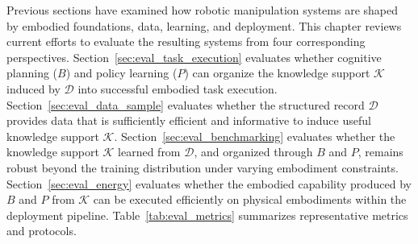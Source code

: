 \documentclass[acmsmall,screen,review]{acmart}
\begin{document}
Previous sections have examined how robotic manipulation systems are shaped by embodied foundations, data, learning, and deployment. 
This chapter reviews current efforts to evaluate the resulting systems from four corresponding perspectives.
Section~\ref{sec:eval_task_execution} evaluates whether cognitive planning (\(B\)) and policy learning (\(P\)) can organize the knowledge support \(\mathcal{K}\) induced by \(\mathcal{D}\) into successful embodied task execution. 
Section~\ref{sec:eval_data_sample} evaluates whether the structured record \(\mathcal{D}\) provides data that is sufficiently efficient and informative to induce useful knowledge support \(\mathcal{K}\). 
Section~\ref{sec:eval_benchmarking} evaluates whether the knowledge support \(\mathcal{K}\) learned from \(\mathcal{D}\), and organized through \(B\) and \(P\), remains robust beyond the training distribution under varying embodiment constraints. 
Section~\ref{sec:eval_energy} evaluates whether the embodied capability produced by \(B\) and \(P\) from \(\mathcal{K}\) can be executed efficiently on physical embodiments within the deployment pipeline.
Table~\ref{tab:eval_metrics} summarizes representative metrics and protocols.
\end{document}
